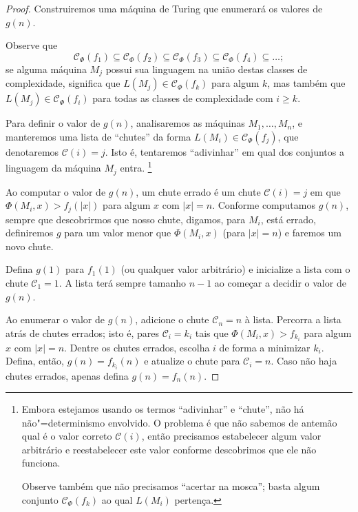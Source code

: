 \begin{proof}
    Construiremos uma máquina de Turing
    que enumerará os valores de $g(n)$.

    Observe que
    \begin{equation*}
        \mathcal C_\Phi(f_1) \subseteq
        \mathcal C_\Phi(f_2) \subseteq
        \mathcal C_\Phi(f_3) \subseteq
        \mathcal C_\Phi(f_4) \subseteq
        \dots;
    \end{equation*}
    se alguma máquina $M_j$ possui sua linguagem
    na união destas classes de complexidade,
    significa que $L(M_j) \in \mathcal C_\Phi(f_k)$
    para algum $k$,
    mas também que $L(M_j) \in \mathcal C_\Phi(f_i)$
    para todas as classes de complexidade com $i \geq k$.

    Para definir o valor de $g(n)$,
    analisaremos as máquinas $M_1, \dots, M_n$,
    e manteremos uma lista de ``chutes''
    da forma $L(M_i) \in \mathcal C_\Phi(f_j)$,
    que denotaremos $\mathcal C(i) = j$.
    Isto é, tentaremos ``adivinhar''
    em qual dos conjuntos a linguagem da máquina $M_j$ entra.%
    \footnote{
        Embora estejamos usando os termos
        ``adivinhar'' e ``chute'',
        não há não"=determinismo envolvido.
        O problema é que não sabemos de antemão
        qual é o valor correto $\mathcal C(i)$,
        então precisamos estabelecer algum valor arbitrário
        e reestabelecer este valor
        conforme descobrimos que ele não funciona.

        Observe também que não precisamos
        ``acertar na mosca'';
        basta algum conjunto $\mathcal C_\Phi(f_k)$
        ao qual $L(M_i)$ pertença.
    }

    Ao computar o valor de $g(n)$,
    um chute errado
    é um chute $\mathcal C(i) = j$
    em que $\Phi(M_i, x) > f_j(|x|)$
    para algum $x$ com $|x| = n$.
    Conforme computamos $g(n)$,
    sempre que descobrirmos que nosso chute,
    digamos, para $M_i$, está errado,
    definiremos $g$ para um valor menor que $\Phi(M_i, x)$
    (para $|x| = n$)
    e faremos um novo chute.

    Defina $g(1)$ para $f_1(1)$
    (ou qualquer valor arbitrário)
    e inicialize a lista com o chute
    $\mathcal C_1 = 1$.
    A lista terá sempre tamanho $n-1$
    ao começar a decidir o valor de $g(n)$.

    Ao enumerar o valor de $g(n)$,
    adicione o chute $\mathcal C_n = n$ à lista.
    Percorra a lista atrás de chutes errados;
    isto é,
    pares $\mathcal C_i = k_i$
    tais que $\Phi(M_i, x) > f_{k_i}$
    para algum $x$ com $|x| = n$.
    Dentre os chutes errados,
    escolha $i$ de forma a minimizar $k_i$.
    Defina, então, $g(n) = f_{k_i}(n)$
    e atualize o chute para $\mathcal C_i = n$.
    Caso não haja chutes errados,
    apenas defina $g(n) = f_n(n)$.


\end{proof}
